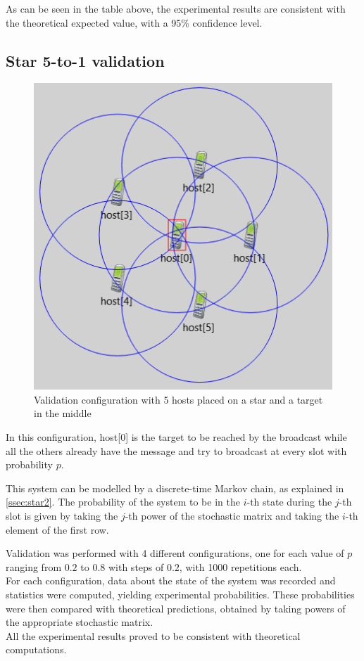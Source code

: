 As can be seen in the table above, %
the experimental results are consistent with the theoretical expected value, with a 95\% confidence level. %
\subsection{Star 5-to-1 validation}


\begin{figure}
\includegraphics[width=1\linewidth]{img/omnetStar5to1.png} 
\caption{Validation configuration with 5 hosts placed on a star and a target in the middle}
\label{fig:star5to1GUI}
\end{figure}

In this configuration, host[0] is the target to be reached by the broadcast while all the others already have the message and try to broadcast at every slot with probability $p$.

This system can be modelled by a discrete-time Markov chain, as explained in \ref{ssec:star2}.
The probability of the system to be in the $i$-th state during the $j$-th slot is given by taking the $j$-th power of the stochastic matrix and taking the $i$-th element of the first row.

Validation was performed with 4 different configurations, one for each value of $p$ ranging from $0.2$ to $0.8$ with steps of $0.2$, with 1000 repetitions each.\\
For each configuration, data about the state of the system was recorded and statistics were computed, yielding experimental probabilities. These probabilities were then compared with theoretical predictions, obtained by taking powers of the appropriate stochastic matrix.\\
All the experimental results proved to be consistent with theoretical computations.

